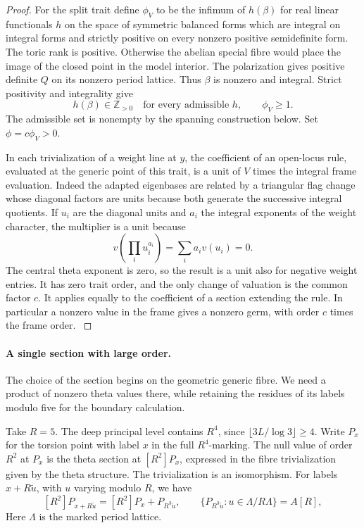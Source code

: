 \begin{proof}
For the split trait define \(\phi_V\) to be the infimum of
\(h(\beta)\) for real linear functionals \(h\) on the space
of symmetric balanced forms which are integral on integral
forms and strictly positive on every nonzero positive
semidefinite form. The toric rank is positive. Otherwise
the abelian special fibre would place the image of the
closed point in the model interior. The polarization gives
positive definite \(Q\) on its nonzero period lattice.
Thus \(\beta\) is nonzero and integral. Strict positivity and integrality give
\[
 h(\beta)\in\mathbb Z_{>0}\quad\text{for every admissible }h,\qquad \phi_V\ge1.
\]
The admissible
set is nonempty by the spanning construction below. Set
\(\phi=c\phi_V>0\).

In each trivialization of a weight line at \(y\), the
coefficient of an open-locus rule, evaluated at the generic
point of this trait, is a unit of \(V\) times the integral
frame evaluation. Indeed the adapted eigenbases are related
by a triangular flag change whose diagonal factors are units
because both generate the successive integral quotients.
If \(u_i\) are the diagonal units and \(a_i\) the integral exponents of the weight character, the multiplier is a unit because
\[
 v\!\left(\prod_i u_i^{a_i}\right)=\sum_i a_i v(u_i)=0.
\]
The central
theta exponent is zero, so the result is a unit also for
negative weight entries. It has zero trait order, and the
only change of valuation is the common factor \(c\). It applies equally to the
coefficient of a section extending the rule. In particular
a nonzero value in the frame gives a nonzero germ, with order \(c\)
times the frame order. \label{cor:deep-boundary-orders-2}

\end{proof}

\paragraph{A single section with large order.}
The choice of the section begins on the geometric generic fibre. We
need a product of nonzero theta values there, while retaining the
residues of its labels modulo five for the boundary calculation.

Take \(R=5\). The deep principal level contains \(R^4\), since
\(\lfloor3L/\log3\rfloor\ge4\). Write \(P_x\) for the torsion
point with label \(x\) in the full \(R^4\)-marking. The null
value of order \(R^2\) at \(P_x\) is the theta section at
\([R^2]P_x\), expressed in the fibre trivialization given by the
theta structure. The trivialization is an isomorphism. For labels
\(x+R\widetilde u\), with \(u\) varying modulo \(R\), we have
\[
   [R^2]P_{x+R\widetilde u}=[R^2]P_x+P_{R^3\widetilde u},
   \qquad \{P_{R^3\widetilde u}:u\in\Lambda/R\Lambda\}=A[R],
\]
Here \(\Lambda\) is the marked period lattice.

